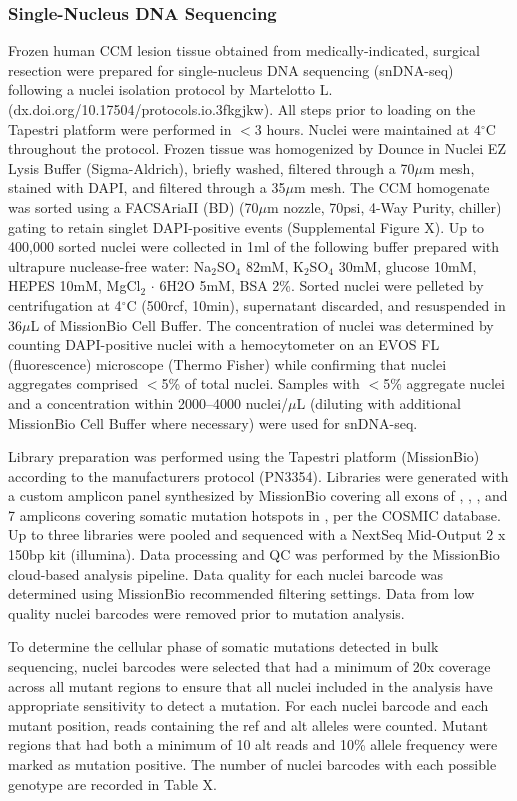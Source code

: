 \subsubsection{Single-Nucleus DNA Sequencing}
Frozen human CCM lesion tissue obtained from medically-indicated, surgical resection were prepared for single-nucleus DNA sequencing (snDNA-seq) following a nuclei isolation protocol by Martelotto L. (dx.doi.org/10.17504/protocols.io.3fkgjkw). All steps prior to loading on the Tapestri platform were performed in $<$3 hours. Nuclei were maintained at 4$^{\circ}$C throughout the protocol. Frozen tissue was homogenized by Dounce in Nuclei EZ Lysis Buffer (Sigma-Aldrich), briefly washed, filtered through a 70$\mu$m mesh, stained with DAPI, and filtered through a 35$\mu$m mesh. The CCM homogenate was sorted using a FACSAriaII (BD) (70$\mu$m nozzle, 70psi, 4-Way Purity, chiller) gating to retain singlet DAPI-positive events (Supplemental Figure X). Up to 400,000 sorted nuclei were collected in 1ml of the following buffer prepared with ultrapure nuclease-free water: Na$_2$SO$_4$ 82mM, K$_2$SO$_4$ 30mM, glucose 10mM, HEPES 10mM, MgCl$_2$ $\cdot$ 6H2O 5mM, BSA 2\%. Sorted nuclei were pelleted by centrifugation at 4$^{\circ}$C (500rcf, 10min), supernatant discarded, and resuspended in 36$\mu$L of MissionBio Cell Buffer. The concentration of nuclei was determined by counting DAPI-positive nuclei with a hemocytometer on an EVOS FL (fluorescence) microscope (Thermo Fisher) while confirming that nuclei aggregates comprised $<$5\% of total nuclei. Samples with $<$5\% aggregate nuclei and a concentration within 2000--4000 nuclei/$\mu$L (diluting with additional MissionBio Cell Buffer where necessary) were used for snDNA-seq.

Library preparation was performed using the Tapestri platform (MissionBio) according to the manufacturers protocol (PN3354). Libraries were generated with a custom amplicon panel synthesized by MissionBio covering all exons of , , , and 7 amplicons covering somatic mutation hotspots in , per the COSMIC database. Up to three libraries were pooled and sequenced with a NextSeq Mid-Output 2 x 150bp kit (illumina). Data processing and QC was performed by the MissionBio cloud-based analysis pipeline. Data quality for each nuclei barcode was determined using MissionBio recommended filtering settings. Data from low quality nuclei barcodes were removed prior to mutation analysis. 
	
To determine the cellular phase of somatic mutations detected in bulk sequencing, nuclei barcodes were selected that had a minimum of 20x coverage across all mutant regions to ensure that all nuclei included in the analysis have appropriate sensitivity to detect a mutation. For each nuclei barcode and each mutant position, reads containing the ref and alt alleles were counted. Mutant regions that had both a minimum of 10 alt reads and 10\% allele frequency were marked as mutation positive. The number of nuclei barcodes with each possible genotype are recorded in Table X. 
	

